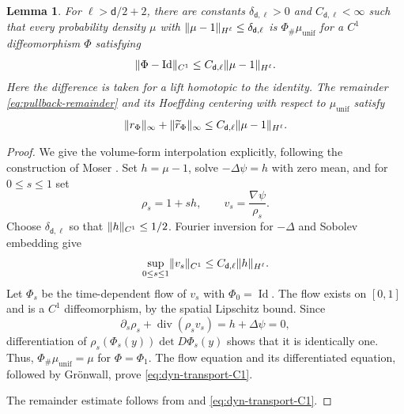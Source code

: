 \documentclass[11pt,reqno]{amsart}
\numberwithin{equation}{section}
\theoremstyle{plain}
\newtheorem{lemma}[lemma]{Lemma}
\theoremstyle{definition}
\DeclarePairedDelimiter{\norm}{\lVert}{\rVert}
\renewcommand{\d}{\mathsf d}
\newcommand{\Id}{\operatorname{Id}}
\newcommand{\tl}{\widetilde}
\newcommand{\muunif}{\mu_{\mathrm{unif}}}
\DeclareMathOperator{\diver}{div}
\begin{document}
\begin{lemma}
\label{lem:sobolev-transport}
For $\ell>\d/2+2$, there are constants $\delta_{\d,\ell}>0$ and $C_{\d,\ell}<\infty$ such that every probability density $\mu$ with $\norm{\mu-1}_{H^\ell}\leq\delta_{\d,\ell}$ is $\Phi_\#\muunif$ for a $C^1$ diffeomorphism $\Phi$ satisfying
\begin{equation}
 \norm{\Phi-\Id}_{C^1}\leq C_{\d,\ell}\norm{\mu-1}_{H^\ell}.
 \label{eq:dyn-transport-C1}
\end{equation}
Here the difference is taken for a lift homotopic to the identity. The remainder \eqref{eq:pullback-remainder} and its Hoeffding centering with respect to $\muunif$ satisfy
\begin{equation}
 \norm{r_\Phi}_\infty+\norm{\tl r_\Phi}_\infty
 \leq C_{\d,\ell}\norm{\mu-1}_{H^\ell}.
 \label{eq:dyn-r-bound}
\end{equation}
\end{lemma}
\begin{proof}
We give the volume-form interpolation explicitly, following the construction of Moser \cite{Moser1965}. Set $h=\mu-1$, solve $-\Delta\psi=h$ with zero mean, and for $0\leq s\leq1$ set
\begin{equation}
 \rho_s=1+sh,\qquad v_s=\frac{\nabla\psi}{\rho_s}.
 \label{eq:dyn-moser}
\end{equation}
Choose $\delta_{\d,\ell}$ so that $\norm h_{C^1}\leq1/2$. Fourier inversion for $-\Delta$ and Sobolev embedding give
\begin{equation}
 \sup_{0\leq s\leq1}\norm{v_s}_{C^1}\leq C_{\d,\ell}\norm h_{H^\ell}.
 \label{eq:dyn-moser-v}
\end{equation}
Let $\Phi_s$ be the time-dependent flow of $v_s$ with $\Phi_0=\Id$. The flow exists on $[0,1]$ and is a $C^1$ diffeomorphism, by the spatial Lipschitz bound. Since
\begin{equation}
 \partial_s\rho_s+\diver(\rho_s v_s)=h+\Delta\psi=0,
 \label{eq:dyn-moser-continuity}
\end{equation}
differentiation of $\rho_s(\Phi_s(y))\det D\Phi_s(y)$ shows that it is identically one. Thus, $\Phi_\#\muunif=\mu$ for $\Phi=\Phi_1$. The flow equation and its differentiated equation, followed by Gr\"onwall, prove \eqref{eq:dyn-transport-C1}.

The remainder estimate follows from  and \eqref{eq:dyn-transport-C1}.
\end{proof}
\end{document}
